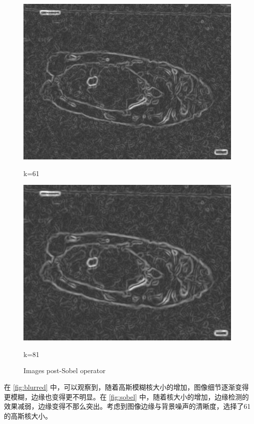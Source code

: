 \begin{figure}
\begin{minipage}{0.24\textwidth}
        \includegraphics[width=\textwidth]{./fig/gausssian/sobel61.jpg}
        \caption*{k=61}
        \label{fig:sobel61}
    \end{minipage}
    \begin{minipage}{0.24\textwidth}
        \centering
        \includegraphics[width=\textwidth]{./fig/gausssian/sobel81.jpg}
        \caption*{k=81}
        \label{fig:sobel81}
    \end{minipage}
    \caption{Images post-Sobel operator}
    \label{fig:sobel}
\end{figure}


在 \autoref{fig:blurred} 中，可以观察到，随着高斯模糊核大小的增加，图像细节逐渐变得更模糊，边缘也变得更不明显。在 \autoref{fig:sobel} 中，随着核大小的增加，边缘检测的效果减弱，边缘变得不那么突出。考虑到图像边缘与背景噪声的清晰度，选择了61的高斯核大小。

